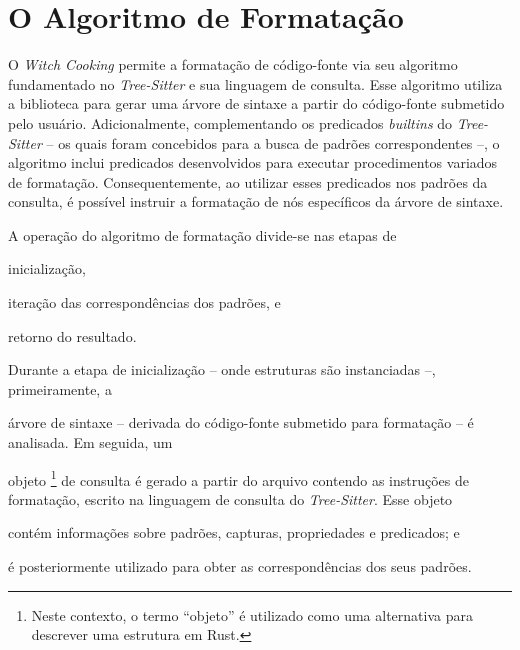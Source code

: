 \documentclass
  [11pt,a4paper,english,brazil,openright,sumario=tradicional,twoside]
  {abntex2}
\newcommand{\treesitter}{\textit{Tree-Sitter}\xspace}
\newcommand{\witchcooking}{\textit{Witch Cooking}\xspace}
\begin{document}
{{  \clearpage

  \section{O Algoritmo de Formatação}

  O \witchcooking permite a formatação de código-fonte via seu algoritmo
  fundamentado no \treesitter e sua linguagem de consulta. Esse algoritmo
  utiliza a biblioteca para gerar uma árvore de sintaxe a partir do
  código-fonte submetido pelo usuário. Adicionalmente, complementando os
  predicados \textit{builtins} do \treesitter{} -- os quais foram concebidos
  para a busca de padrões correspondentes --, o algoritmo inclui predicados
  desenvolvidos para executar procedimentos variados de formatação.
  Consequentemente, ao utilizar esses predicados nos padrões da consulta, é
  possível instruir a formatação de nós específicos da árvore de sintaxe.

  A operação do algoritmo de formatação divide-se nas etapas de
  \begin{inparaenum}
    \item inicialização,
    \item iteração das correspondências dos padrões, e
    \item retorno do resultado.
  \end{inparaenum}
  Durante a etapa de inicialização -- onde estruturas são instanciadas --,
  primeiramente, a
  \begin{inparaenum}
    \item árvore de sintaxe -- derivada do código-fonte submetido para
          formatação -- é analisada. Em seguida, um
    \item objeto%
          \footnote
            { Neste contexto, o termo ``objeto'' é utilizado como uma
              alternativa para descrever uma estrutura em Rust.}
          de consulta é gerado a partir do arquivo contendo as
          instruções de formatação, escrito na linguagem de consulta do
          \treesitter. Esse objeto
          \begin{inparaenum}
            \item contém informações sobre padrões, capturas, propriedades e
                  predicados; e
            \item é posteriormente utilizado para obter as correspondências
                  dos seus padrões.
          \end{inparaenum}


\end{inparaenum}}}
\end{document}
